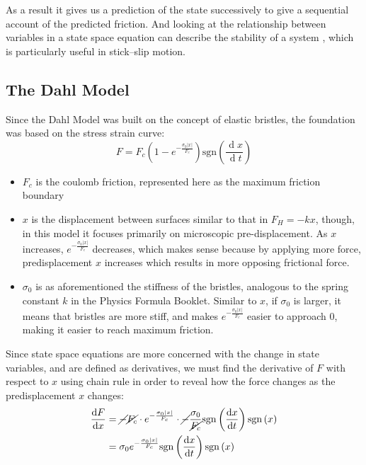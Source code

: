 \documentclass[12pt]{article}
\newcommand{\diff}{\ensuremath{\operatorname{d}\!}}
\begin{document}
As a result it gives us a prediction of the state successively to give a sequential account of the predicted friction. And looking at the relationship between variables in a state space equation can describe the stability of a system \parencite{youtube:sseq}, which is particularly useful in stick--slip motion.



 
\subsection{The Dahl Model} 


Since the Dahl Model was built on the concept of elastic bristles, the foundation was based on the stress strain curve:
\begin{equation}
    F=F_{c}\left(1-e^{-\frac{ \sigma_{0}|x| }{ F_{c} }}\right)\mathrm{sgn}\left(\frac{\diff x}{\diff t}\right)
    \label{eq:dahlexp}
\end{equation}

\begin{itemize}
    \item $F_{c}$ is the coulomb friction, represented here as the maximum friction boundary
    \item $x$ is the displacement between surfaces similar to that in $F_{H} = -kx$, though, in this model it focuses primarily on microscopic pre-displacement. As $x$ increases, $e^{-\frac{\sigma_{0}|x|}{F_{c}}}$ decreases, which makes sense because by applying more force, predisplacement $x$ increases which results in more opposing frictional force.
    \item $\sigma_{0}$ is as aforementioned the stiffness of the bristles, analogous to the spring constant $k$ in the Physics Formula Booklet. Similar to $x$, if $\sigma_{0}$ is larger, it means that bristles are more stiff, and makes $e^{-\frac{\sigma_{0}|x|}{F_{c}}}$ easier to approach 0, making it easier to reach maximum friction.
\end{itemize}

Since state space equations are more concerned with the change in state variables, and are defined as derivatives, we must find the derivative of $F$ with respect to $x$ using chain rule in order to reveal how the force changes as the predisplacement $x$ changes:
\begin{align}
    \frac{\diff F}{\diff x} &= \cancel{-}\cancel{F_{c}}\cdot e^{-\frac{\sigma_{0}|x|}{F_{c}}}\cdot \cancel{-}\frac{\sigma_{0}}{\cancel{F_{c}}}\mathrm{sgn}\left(\frac{\diff x}{\diff t}\right)\mathrm{sgn}\left(x\right) \\
                            &= \sigma_{0}e^{-\frac{\sigma_{0}|x|}{F_{c}}}\mathrm{sgn}\left(\frac{\diff x}{\diff t}\right)\mathrm{sgn}\left(x\right)
\end{align}
\end{document}
